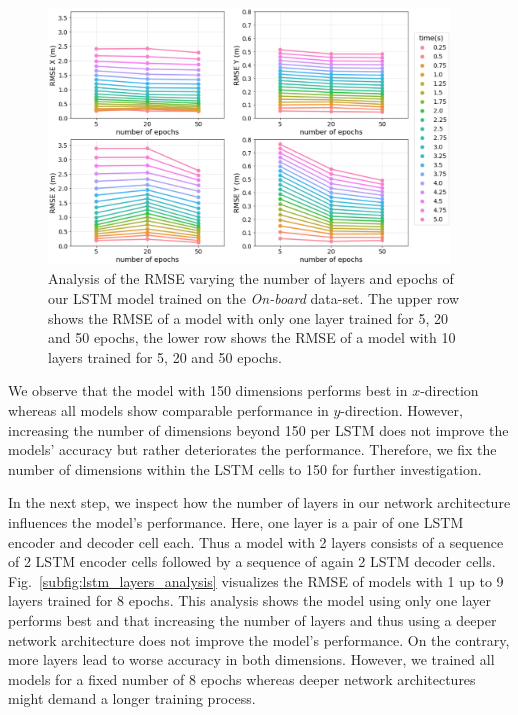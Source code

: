 \begin{figure}[t!]
  \centering
  \includegraphics[width=0.95\textwidth]{imgs/lstm_layers_epochs_analysis.eps}
  \caption{Analysis of the \ac{RMSE} varying the number of layers and epochs of our \ac{LSTM} model trained on the \emph{On-board} data-set. The upper row shows the \ac{RMSE} of a model with only one layer trained for \num{5}, \num{20} and \num{50} epochs, the lower row shows the \ac{RMSE} of a model with \num{10} layers trained for \num{5}, \num{20} and \num{50} epochs.}
  \label{fig:lstm_layers_epochs_analysis}
\end{figure}
We observe that the model with \num{150} dimensions performs best in $x$-direction whereas all models show comparable performance in $y$-direction.
However, increasing the number of dimensions beyond \num{150} per \ac{LSTM} does not improve the models' accuracy but rather deteriorates the performance.
Therefore, we fix the number of dimensions within the \ac{LSTM} cells to \num{150} for further investigation.

In the next step, we inspect how the number of layers in our network architecture influences the model's performance.
Here, one layer is a pair of one \ac{LSTM} encoder and decoder cell each.
Thus a model with \num{2} layers consists of a sequence of \num{2} \ac{LSTM} encoder cells followed by a sequence of again \num{2} \ac{LSTM} decoder cells.
Fig.~\ref{subfig:lstm_layers_analysis} visualizes the \ac{RMSE} of models with \num{1} up to \num{9} layers trained for \num{8} epochs.
This analysis shows the model using only one layer performs best and that increasing the number of layers and thus using a deeper network architecture does not improve the model's performance.
On the contrary, more layers lead to worse accuracy in both dimensions.
However, we trained all models for a fixed number of \num{8} epochs whereas deeper network architectures might demand a longer training process.

